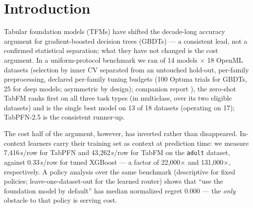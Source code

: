 \documentclass[11pt]{article}
\newcommand{\us}{\textmu s}
\begin{document}
\begin{abstract}
27$\times$ its latency; the 2.5$\times$ case is the erratum dataset
with binarized target), while on the third (kin8nm, a latency case)
a single-member teacher already matches student latency and ensemble
shrinking closes the case;
(3) out-of-fold (OOF) labeling matters for the student's
\textbf{calibration}, not its accuracy --- a deconfounded refinement of prior classification findings;
and (4) failures are diagnosable, yielding a practical decision rule: run
target transforms as a diagnostic and a strong native student first,
and distill when a
genuine teacher edge persists --- cheaply verifiable via OOF labeling.
Hypotheses and gates were registered in advance --- the confirmatory
sign test and the extension's eligibility rule were fixed at an interim
look, and headline $p$-values carry the corresponding two-stage
sequential correction --- and all
experiments are seed-controlled and publicly reproducible
on a single 16\,GB GPU. With both arms re-tuned, the median CRPS gain
is 1.4\% (vs.\ 2.8\% inherited) and median retention 0.124 --- the
conservative estimate.
\end{abstract}

\section{Introduction}

Tabular foundation models (TFMs) have shifted the decade-long accuracy
argument for gradient-boosted decision trees (GBDTs)
\citep{grinsztajn2022,mcelfresh2023} --- a consistent lead, not a
confirmed statistical separation; what they have not changed is the
cost argument. In a uniform-protocol benchmark we ran of 14 models
$\times$ 18 OpenML datasets (selection by inner CV separated from an untouched hold-out, per-family
preprocessing, declared per-family tuning budgets (100 Optuna
trials for GBDTs, 25 for deep models; asymmetric by design);
companion report
\citep{companion2026}), the zero-shot TabFM ranks first on all three task
types (in multiclass, over its two eligible datasets) and is the
single best model on 13 of 18 datasets (operating
on 17); TabPFN-2.5
\citep{hollmann2025,priorlabs2025} is the consistent runner-up.

The cost half of the argument, however, has inverted rather than
disappeared.
In-context learners carry their training set as context at prediction time:
we measure 7{,}416\,\us/row for TabPFN and 43{,}262\,\us/row for TabFM on
the \texttt{adult} dataset, against 0.33\,\us/row for tuned XGBoost --- a
factor of 22{,}000$\times$ and 131{,}000$\times$, respectively.
A policy analysis over the same benchmark (descriptive for fixed
policies; leave-one-dataset-out for the learned router) shows that
``use the foundation model by default'' has median normalized regret 0.000
--- the \emph{only} obstacle to that policy is serving cost.
\end{document}
